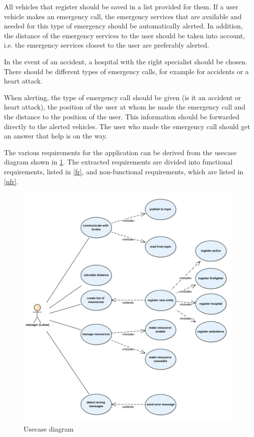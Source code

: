 All vehicles that register should be saved in a list provided for them. If a user vehicle makes an emergency call, the emergency services that are available and needed for this type of emergency should be automatically alerted. In addition, the distance of the emergency services to the user should be taken into account, i.e. the emergency services closest to the user are preferably alerted. 

In the event of an accident, a hospital with the right specialist should be chosen. There should be different types of emergency calls, for example for accidents or a heart attack. 

When alerting, the type of emergency call should be given (is it an accident or heart attack), the position of the user at whom he made the emergency call and the distance to the position of the user. This information should be forwarded directly to the alerted vehicles. The user who made the emergency call should get an answer that help is on the way.



The various requirements for the application can be derived from the usecase diagram shown in \ref{usecase}. The extracted requirements are divided into functional requirements, listed in \ref{fr}, and non-functional requirements, which are listed in \ref{nfr}.

\begin{figure}[h]
\sidecaption
\includegraphics[scale=0.6]{images/walter/usecase_png.png}
\caption{Usecase diagram}
\label{usecase}
\end{figure}

